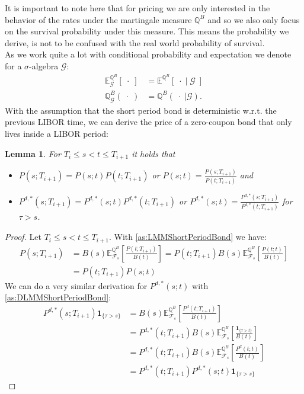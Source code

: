 \documentclass[12pt]{article}
\newtheorem{lemma}[theorem]{Lemma}
\begin{document}
	It is important to note here that for pricing we are only interested in the behavior of the rates under the martingale measure $\mathbb{Q}^B$ and so we also only focus on the survival probability under this measure. This means the probability we derive, is not to be confused with the real world probability of survival.\\
	
	As we work quite a lot with conditional probability and expectation we denote for a $\sigma$-algebra $\mathcal{G}$:
	\begin{align*}
		\mathbb{E}^{\mathbb{Q}^B}_{\mathcal{G}}\left[ \; \cdot \; \right] &=  \mathbb{E}^{\mathbb{Q}^B}\left[ \; \cdot \; | \; \mathcal{G} \; \right]\\
		\mathbb{Q}^B_{\mathcal{G}}\left(\;\cdot \; \right) &= \mathbb{Q}^B\left( \left. \;\cdot \; \right| \mathcal{G} \right).
	\end{align*} 
	With the assumption that the short period bond is deterministic w.r.t. the previous LIBOR time, we can derive the price of a zero-coupon bond that only lives inside a LIBOR period:
	\begin{lemma}
		For $T_i \le s < t \le T_{i+1}$ it holds that
		\begin{itemize}
			\item $P(s;T_{i+1}) = P(s;t)P(t;T_{i+1})$ or 
			$P(s;t) = \frac{P(s;T_{i+1})}{P(t;T_{i+1})}$ and
			\item $P^{d,*}(s;T_{i+1}) = P^{d,*}(s;t)P^{d,*}(t;T_{i+1})$ or 
			$P^{d,*}(s;t) = \frac{P^{d,*}(s;T_{i+1})}{P^{d,*}(t;T_{i+1})}$ for $\tau > s$.
		\end{itemize}
	\end{lemma}
	\begin{proof}
		Let $T_i \le s < t \le T_{i+1}$. With \cref{as:LMMShortPeriodBond} we have: 
		\begin{align*}
			P(s;T_{i+1}) &= B(s) \mathbb{E}^{\mathbb{Q}^B}_{\mathcal{F}_s}\left[\frac{P(t;T_{i+1})}{B(t)} \right] = P(t;T_{i+1})B(s)\mathbb{E}^{\mathbb{Q}^B}_{\mathcal{F}_s}\left[\frac{P(t;t)}{B(t)}\right]\\
			&=P(t;T_{i+1})P(s;t)
		\end{align*}
		We can do a very similar derivation for $P^{d,*}(s;t)$ with \cref{as:DLMMShortPeriodBond}:
		\begin{align*}
			P^{d,*}(s;T_{i+1}) \mathbf{1}_{\{\tau > s\}} &= B(s)\mathbb{E}^{\mathbb{Q}^B}_{\mathcal{F}_{s}}\left[\frac{P^d(t;T_{i+1})}{B(t)} \right]\\
			&= P^{d,*}(t;T_{i+1}) B(s)\mathbb{E}^{\mathbb{Q}^B}_{\mathcal{F}_{s}}\left[\frac{\mathbf{1}_{\{\tau > t\}}}{B(t)} \right]\\
			&= P^{d,*}(t;T_{i+1}) B(s)\mathbb{E}^{\mathbb{Q}^B}_{\mathcal{F}_{s}}\left[\frac{P^d(t;t)}{B(t)} \right] \\
			&= P^{d,*}(t;T_{i+1})P^{d,*}(s;t)\mathbf{1}_{\{\tau > s\}}
		\end{align*}
	\end{proof}
\end{document}
